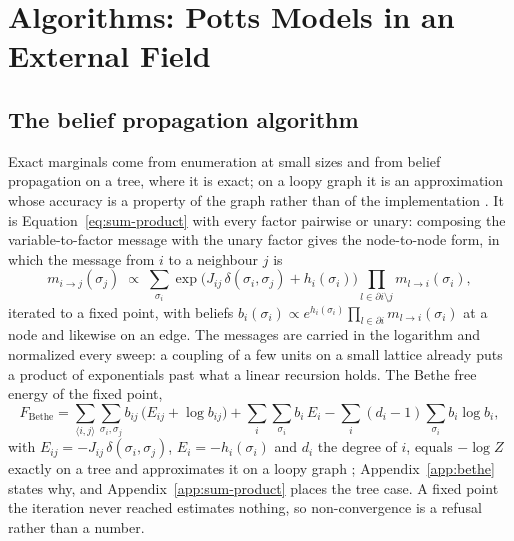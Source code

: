 \documentclass[11pt,a4paper]{article}
\begin{document}
\section{Algorithms: Potts Models in an External Field}
\label{sec:potts:algorithms}

\subsection{The belief propagation algorithm}
Exact marginals come from enumeration at small sizes and from belief
propagation on a tree, where it is exact; on a loopy graph it is an
approximation whose accuracy is a property of the graph rather than of the
implementation \citep{koller2009, frey1998}. It is Equation~\ref{eq:sum-product}
with every factor pairwise or unary: composing the variable-to-factor message
with the unary factor gives the node-to-node form, in which the message from
$i$ to a neighbour $j$ is
\begin{equation}
  m_{i \to j}(\sigma_j) \;\propto\; \sum_{\sigma_i}
    \exp\!\big(J_{ij}\,\delta(\sigma_i,\sigma_j) + h_i(\sigma_i)\big)
    \prod_{l \in \partial i \setminus j} m_{l \to i}(\sigma_i),
  \label{eq:bp-message}
\end{equation}
iterated to a fixed point, with beliefs $b_i(\sigma_i) \propto e^{h_i(\sigma_i)}
\prod_{l \in \partial i} m_{l \to i}(\sigma_i)$ at a node and likewise on an
edge. The messages are carried in the logarithm and normalized every sweep: a
coupling of a few units on a small lattice already puts a product of
exponentials past what a linear recursion holds. The Bethe free energy of the
fixed point,
\begin{equation}
  F_{\mathrm{Bethe}}
    = \sum_{\langle i,j \rangle} \sum_{\sigma_i,\sigma_j}
        b_{ij}\,\big(E_{ij} + \log b_{ij}\big)
    + \sum_i \sum_{\sigma_i} b_i\, E_i
    - \sum_i (d_i - 1) \sum_{\sigma_i} b_i \log b_i,
  \label{eq:bethe}
\end{equation}
with $E_{ij} = -J_{ij}\,\delta(\sigma_i,\sigma_j)$, $E_i = -h_i(\sigma_i)$ and
$d_i$ the degree of $i$, equals $-\log Z$ exactly on a tree and approximates
it on a loopy graph \citep{yedidia2005, mezard2009}; Appendix~\ref{app:bethe}
states why, and Appendix~\ref{app:sum-product} places the tree case. A fixed
point the iteration never reached estimates nothing, so non-convergence is a
refusal rather than a number.
\end{document}
